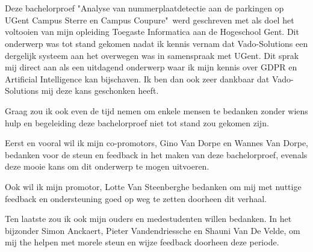 
\chapter*{}
\label{ch:voorwoord}


Deze bachelorproef "Analyse van nummerplaatdetectie aan de parkingen op UGent Campus Sterre en Campus Coupure"\ werd geschreven met als doel het voltooien van mijn opleiding Toegaste Informatica aan de Hogeschool Gent. Dit onderwerp was tot stand gekomen nadat ik kennis vernam dat Vado-Solutions een dergelijk systeem aan het overwegen was in samenspraak met UGent. Dit sprak mij direct aan als een uitdagend onderwerp waar ik mijn kennis over GDPR en Artificial Intelligence kan bijschaven. Ik ben dan ook zeer dankbaar dat Vado-Solutions mij deze kans geschonken heeft.

Graag zou ik ook even de tijd nemen om enkele mensen te bedanken zonder wiens hulp en begeleiding deze bachelorproef niet tot stand zou gekomen zijn.

Eerst en vooral wil ik mijn co-promotors, Gino Van Dorpe en Wannes Van Dorpe, bedanken voor de steun en feedback in het maken van deze bachelorproef, evenals deze mooie kans om dit onderwerp te mogen uitvoeren.

Ook wil ik mijn promotor, Lotte Van Steenberghe bedanken om mij met nuttige feedback en ondersteuning goed op weg te zetten doorheen dit verhaal.

Ten laatste zou ik ook mijn ouders en medestudenten willen bedanken. In het bijzonder Simon Anckaert, Pieter Vandendriessche en Shauni Van De Velde, om mij the helpen met morele steun en wijze feedback doorheen deze periode.